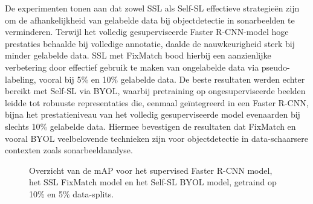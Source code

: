 \documentclass[a0,portrait]{hogent-poster}
\begin{document}
\begin{multicols}{2}
De experimenten tonen aan dat zowel SSL als Self-SL effectieve strategieën zijn om de afhankelijkheid van gelabelde data bij objectdetectie in sonarbeelden te verminderen. Terwijl het volledig gesuperviseerde Faster R-CNN-model hoge prestaties behaalde bij volledige annotatie, daalde de nauwkeurigheid sterk bij minder gelabelde data. SSL met FixMatch bood hierbij een aanzienlijke verbetering door effectief gebruik te maken van ongelabelde data via pseudo-labeling, vooral bij 5\% en 10\% gelabelde data. De beste resultaten werden echter bereikt met Self-SL via BYOL, waarbij pretraining op ongesuperviseerde beelden leidde tot robuuste representaties die, eenmaal geïntegreerd in een Faster R-CNN, bijna het prestatieniveau van het volledig gesuperviseerde model evenaarden bij slechts 10\% gelabelde data. Hiermee bevestigen de resultaten dat FixMatch en vooral BYOL veelbelovende technieken zijn voor objectdetectie in data-schaarsere contexten zoals sonarbeeldanalyse.

\begin{figure}[H]
    \centering
    \caption{Overzicht van de mAP voor het supervised Faster R-CNN model, het SSL FixMatch model en het Self-SL BYOL model, getraind op 10\% en 5\% data-splits.}
\end{figure}


\end{multicols}
\end{document}
